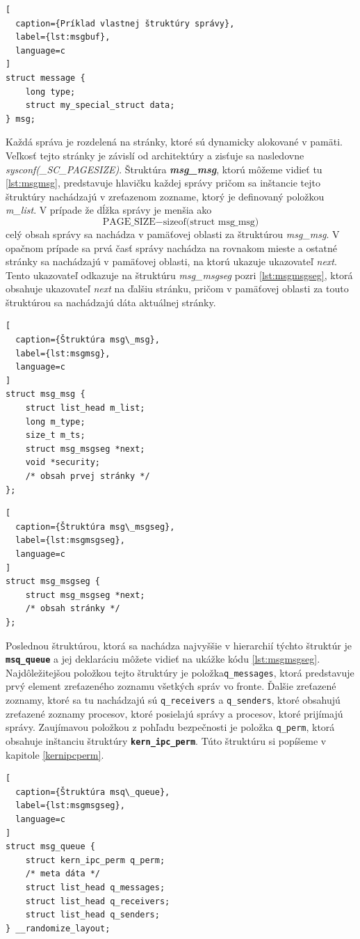 \begin{lstlisting}[
  caption={Príklad vlastnej štruktúry správy},
  label={lst:msgbuf},
  language=c
]
struct message {
    long type;
    struct my_special_struct data;    
} msg;
\end{lstlisting}

Každá správa je rozdelená na stránky, ktoré sú dynamicky alokované v pamäti. Veľkosť tejto stránky je závislí od architektúry a zisťuje sa nasledovne \textit{sysconf(\_SC\_PAGESIZE)}. Štruktúra \textbf{\textit{msg\_msg}}, ktorú môžeme vidieť tu \ref{lst:msgmsg}, predstavuje hlavičku každej správy pričom sa inštancie tejto štruktúry nachádzajú v zreťazenom zozname, ktorý je definovaný položkou \textit{m\_list}. V prípade že dĺžka správy je menšia ako $$ \text{PAGE\_SIZE} - \text{sizeof(struct msg\_msg)} $$ celý obsah správy sa nachádza v pamäťovej oblasti za štruktúrou \textit{msg\_msg}. V opačnom prípade sa prvá časť správy nachádza na rovnakom mieste a ostatné stránky sa nachádzajú v pamäťovej oblasti, na ktorú ukazuje ukazovateľ \textit{next}. Tento ukazovateľ odkazuje na štruktúru \textit{msg\_msgseg} pozri \ref{lst:msgmsgseg}, ktorá obsahuje ukazovateľ \textit{next} na ďalšiu stránku, pričom v pamäťovej oblasti za touto štruktúrou sa nachádzajú dáta aktuálnej stránky.
\begin{lstlisting}[
  caption={Štruktúra msg\_msg},
  label={lst:msgmsg},
  language=c
]
struct msg_msg {
	struct list_head m_list;
	long m_type;
	size_t m_ts;
	struct msg_msgseg *next;
	void *security;
	/* obsah prvej stránky */
};
\end{lstlisting}

\begin{lstlisting}[
  caption={Štruktúra msg\_msgseg},
  label={lst:msgmsgseg},
  language=c
]
struct msg_msgseg {
	struct msg_msgseg *next;
	/* obsah stránky */
};
\end{lstlisting}

Poslednou štruktúrou, ktorá sa nachádza najvyššie v hierarchií týchto štruktúr je \texttt{\textbf{msq\_queue}} a jej deklaráciu môžete vidieť na ukážke kódu \ref{lst:msgmsgseg}. Najdôležitejšou položkou tejto štruktúry je položka\texttt{q\_messages}, ktorá predstavuje prvý element zreťazeného zoznamu všetkých správ vo fronte. Ďalšie zreťazené zoznamy, ktoré sa tu nachádzajú sú \texttt{q\_receivers} a \texttt{q\_senders}, ktoré obsahujú zreťazené zoznamy procesov, ktoré posielajú správy a procesov, ktoré prijímajú správy. Zaujímavou položkou z pohľadu bezpečnosti je položka \texttt{q\_perm}, ktorá obsahuje inštanciu štruktúry \texttt{\textbf{kern\_ipc\_perm}}. Túto štruktúru si popíšeme v kapitole \ref{kernipcperm}.\cite{linux}
\begin{lstlisting}[
  caption={Štruktúra msq\_queue},
  label={lst:msgmsgseg},
  language=c
]
struct msg_queue {
	struct kern_ipc_perm q_perm;
	/* meta dáta */		
	struct list_head q_messages;
	struct list_head q_receivers;
	struct list_head q_senders;
} __randomize_layout;
\end{lstlisting}
